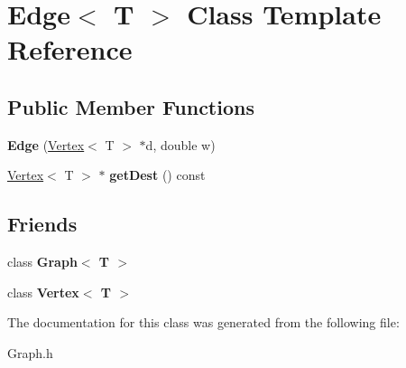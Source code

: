 \hypertarget{class_edge}{}\section{Edge$<$ T $>$ Class Template Reference}
\label{class_edge}
\subsection*{Public Member Functions}
\begin{DoxyCompactItemize}
\item 
{\bfseries Edge} (\hyperlink{class_vertex}{Vertex}$<$ T $>$ $\ast$d, double w)\hypertarget{class_edge_a9da861a03f920c89984be33515a5d870}{}\label{class_edge_a9da861a03f920c89984be33515a5d870}

\item 
\hyperlink{class_vertex}{Vertex}$<$ T $>$ $\ast$ {\bfseries get\+Dest} () const \hypertarget{class_edge_aaf3e4cfb5351c3887c3f48b1c39e17f8}{}\label{class_edge_aaf3e4cfb5351c3887c3f48b1c39e17f8}

\end{DoxyCompactItemize}
\subsection*{Friends}
\begin{DoxyCompactItemize}
\item 
class {\bfseries Graph$<$ T $>$}\hypertarget{class_edge_aefa9b76cd57411c5354e5620dc2d84dd}{}\label{class_edge_aefa9b76cd57411c5354e5620dc2d84dd}

\item 
class {\bfseries Vertex$<$ T $>$}\hypertarget{class_edge_a2e120a12dec663fa334633b4f26cbed8}{}\label{class_edge_a2e120a12dec663fa334633b4f26cbed8}

\end{DoxyCompactItemize}


The documentation for this class was generated from the following file\+:\begin{DoxyCompactItemize}
\item 
Graph.\+h\end{DoxyCompactItemize}
